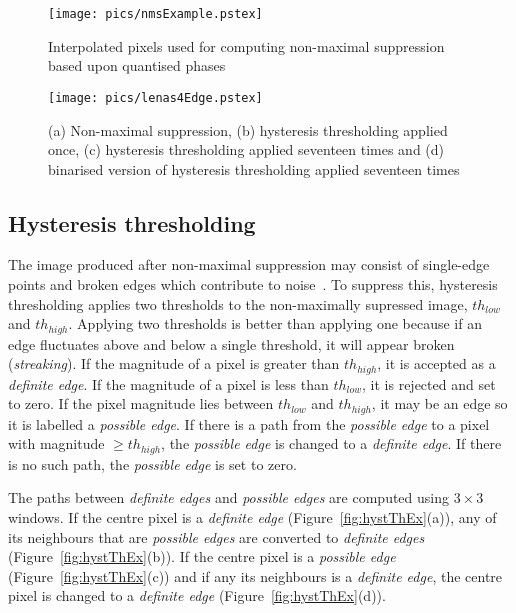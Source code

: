 \documentclass[10pt,twocolumn,letterpaper]{article}
\begin{document}
\begin{figure}[!htb]
\begin{center}
\setlength{\abovecaptionskip}{-0.25cm}
        \texttt{[image: pics/nmsExample.pstex]}
        \caption{Interpolated pixels used for computing non-maximal suppression based upon quantised phases}
        \label{fig:nmsExample}
\setlength{\abovecaptionskip}{0cm}
\end{center}
\end{figure}

\begin{figure}[!htb]
\begin{center}
\setlength{\abovecaptionskip}{-0.25cm}
        \texttt{[image: pics/lenas4Edge.pstex]}
        \caption{(a) Non-maximal suppression, (b) hysteresis thresholding applied once, 
	(c) hysteresis thresholding applied seventeen times
	and (d) binarised version of hysteresis thresholding applied seventeen times}
        \label{fig:3lenas}
\setlength{\abovecaptionskip}{0cm}
\end{center}
\end{figure}

\subsection{Hysteresis thresholding}
The image produced after non-maximal suppression may consist of single-edge points and broken edges which contribute
to noise~\cite{IPtechreport_MSThesis}. To suppress this, hysteresis thresholding applies two thresholds to the 
non-maximally supressed image, $th_{low}$ and $th_{high}$. Applying two thresholds is better than applying one because
if an edge fluctuates above and below a single threshold, it will appear broken (\emph{streaking}). If the magnitude
of a pixel is greater than $th_{high}$, it is accepted as a \emph{definite edge}. 
If the magnitude of a pixel is less than $th_{low}$, it is rejected and set to zero.
If the pixel magnitude lies between $th_{low}$ and $th_{high}$, it may be an edge so it is labelled a \emph{possible edge}.
If there is a path from the \emph{possible edge} to a pixel with magnitude $\geq th_{high}$, the \emph{possible edge} is
changed to a \emph{definite edge}. If there is no such path, the \emph{possible edge} is set to zero.

The paths between \emph{definite edges} and \emph{possible edges} are computed using $3\times 3$ windows.
If the centre pixel is a \emph{definite edge} (Figure~\ref{fig:hystThEx}(a)), any of its neighbours 
that are \emph{possible edges} are 
converted to \emph{definite edges} (Figure~\ref{fig:hystThEx}(b)). 
If the centre pixel is a \emph{possible edge} (Figure~\ref{fig:hystThEx}(c))
and if any its neighbours is a \emph{definite edge}, the centre pixel is changed to 
a \emph{definite edge} (Figure~\ref{fig:hystThEx}(d)).
\end{document}
